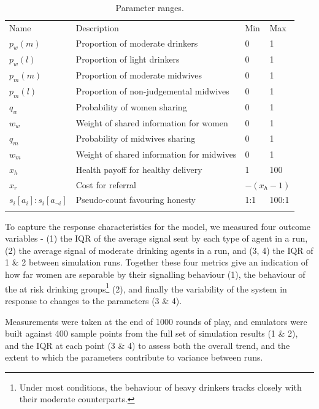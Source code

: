 \documentclass[graybox]{svmult}
\begin{document}
\begin{table}
\caption{Parameter ranges.}
\label{tab:sa_params}
\begin{tabular} {llll}
\hline\noalign{\smallskip}
Name & Description & Min & Max \\
\noalign{\smallskip}\svhline\noalign{\smallskip}
\(p_{w}(m)\) & Proportion of moderate drinkers & 0 & 1 \\ 
\(p_{w}(l)\) & Proportion of light drinkers & 0 & 1 \\ 
\(p_{m}(m)\) & Proportion of moderate midwives & 0 & 1 \\ 
\(p_{m}(l)\) & Proportion of non-judgemental midwives & 0 & 1 \\ 
\(q_{w}\) & Probability of women sharing & 0 & 1 \\ 
\(w_{w}\) & Weight of shared information for women & 0 & 1 \\ 
\(q_{m}\) & Probability of midwives sharing & 0 & 1 \\ 
\(w_{m}\) & Weight of shared information for midwives & 0 & 1 \\ 
\(x_{h}\) & Health payoff for healthy delivery & 1 & 100 \\ 
\(x_{r}\) & Cost for referral & \multicolumn{2}{l}{\(-(x_{h} - 1)\)} \\ 
\(s_{i}[a_{i}]:s_{i}[a_{\neg i}]\) & Pseudo-count favouring honesty & 1:1 & 100:1 \\
\noalign{\smallskip}\hline\noalign{\smallskip}
\end{tabular}
\end{table}

To capture the response characteristics for the model, we measured four outcome variables - (1) the \ac{IQR} of the average signal sent by each type of agent in a run, (2) the average signal of moderate drinking agents in a run, and (3, 4) the \ac{IQR} of 1 \& 2 between simulation runs. Together these four metrics give an indication of how far women are separable by their signalling behaviour (1), the behaviour of the at risk drinking groups\footnote{Under most conditions, the behaviour of heavy drinkers tracks closely with their moderate counterparts.} (2), and finally the variability of the system in response to changes to the parameters (3 \& 4).

Measurements were taken at the end of 1000 rounds of play, and emulators were built against 400 sample points from the full set of simulation results (1 \& 2), and the \ac{IQR} at each point (3 \& 4) to assess both the overall trend, and the extent to which the parameters contribute to variance between runs.
\end{document}
